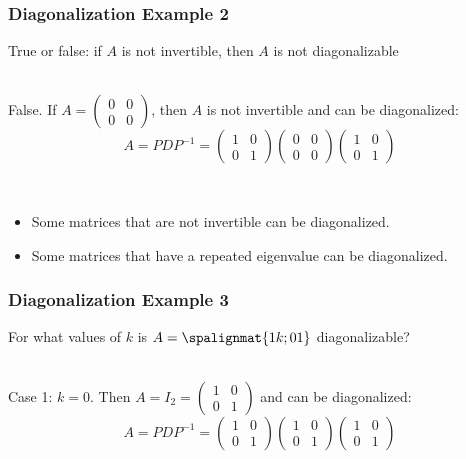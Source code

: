 \begin{frame}\frametitle{Diagonalization Example 2}

    True or false: if $A$ is not invertible, then $A$ is not diagonalizable
    
    \vspace{12pt}
    \\
    False. \pause If $A = \begin{pmatrix} 0 & 0 \\ 0 & 0 \end{pmatrix}$, then $A$ is not invertible and can be diagonalized: \pause
    $$A = PDP^{-1} = \begin{pmatrix} 1 & 0 \\0 & 1 \end{pmatrix}
    \begin{pmatrix} 0 & 0 \\0 & 0 \end{pmatrix}
    \begin{pmatrix} 1 & 0 \\0 & 1 \end{pmatrix}$$
    
    
    \pause 
    
     \\
    
    \begin{itemize}
        \item Some matrices that are not invertible can be diagonalized.
        \item Some matrices that have a repeated eigenvalue can be diagonalized.
    \end{itemize}
\end{frame}


\begin{frame}\frametitle{Diagonalization Example 3}

    For what values of $k$ is $A=\spalignmat{1 k;0 1}$ diagonalizable? 
    
    \pause 
    \vspace{4pt}
    \\ 
    Case 1: $k = 0$. \pause Then $A = I_2 = \begin{pmatrix} 1 & 0 \\ 0 & 1 \end{pmatrix}$ and can be diagonalized: \pause
    $$A = PDP^{-1} = \begin{pmatrix} 1 & 0 \\0 & 1 \end{pmatrix}
    \begin{pmatrix} 1 & 0 \\0 & 1 \end{pmatrix}
    \begin{pmatrix} 1 & 0 \\0 & 1 \end{pmatrix}$$
\end{frame}


